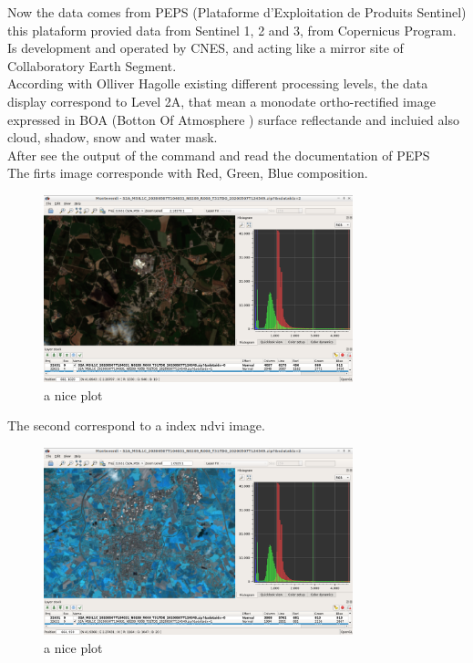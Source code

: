 \documentclass[a4paper,11pt]{article}
\theoremstyle{mytheor}
\begin{document}
Now the data comes from PEPS (Plataforme d'Exploitation de Produits Sentinel) this plataform provied data from Sentinel 1, 2 and 3, from Copernicus Program. Is development and operated by CNES, and acting like a mirror site of Collaboratory Earth Segment.\\

According with Olliver Hagolle existing different processing levels, the data display correspond to Level 2A, that mean a monodate ortho-rectified image expressed in BOA (Botton Of Atmosphere ) surface reflectande and incluied also cloud, shadow, snow and water mask.\\


After see the output of the command and read the documentation of PEPS \\

The firts image corresponde with Red, Green, Blue composition.\\

\begin{figure}[h]
    \centering
    \includegraphics[width=0.8\textwidth]{displayS2A.png}
    \caption{a nice plot}
    \label{fig:mesh1}
\end{figure}

The second correspond to a index ndvi image.\\

\begin{figure}[h]
    \centering
    \includegraphics[width=0.8\textwidth]{displayS2A_index.png}
    \caption{a nice plot}
    \label{fig:mesh1}
\end{figure}
\end{document}
